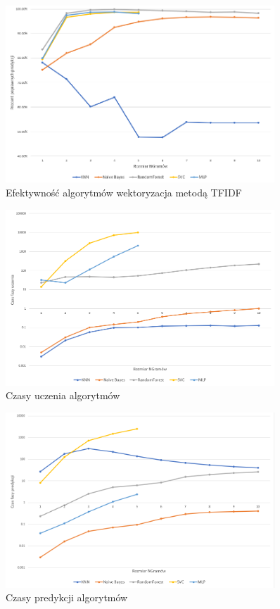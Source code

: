 \begin{figure}[h!]
    \centering
    \includegraphics[width=0.9\textwidth]{./Img/TFIDFAcc.png}
    \caption{Efektywność algorytmów wektoryzacja metodą TFIDF}
\end{figure}

\begin{figure}[h!]
    \centering
    \includegraphics[width=0.9\textwidth]{./Img/BOWLearn.png}
    \caption{Czasy uczenia algorytmów}
\end{figure}

\begin{figure}[h!]
    \centering
    \includegraphics[width=0.9\textwidth]{./Img/BOWPredict.png}
    \caption{Czasy predykcji algorytmów}
\end{figure}


